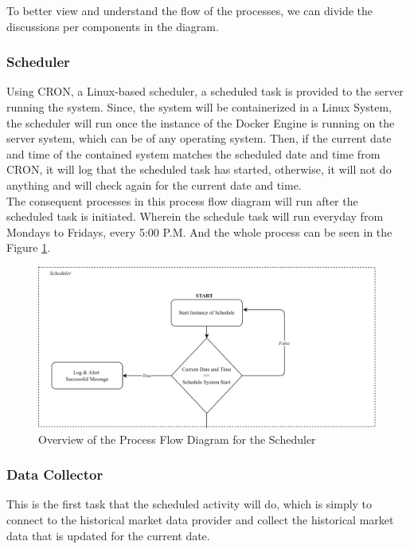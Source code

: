To better view and understand the flow of the processes, 
we can divide the discussions per components in the diagram.

\subsubsection{Scheduler}
\label{subsubsc:scheduler}
Using CRON, a Linux-based scheduler, a 
scheduled task is provided to the server running the system. Since, 
the system will be containerized in a Linux System, the scheduler will 
run once the instance of the Docker Engine is running on the server system, 
which can be of any operating system. Then, if the current date and time of 
the contained system matches the scheduled date and time from CRON, it will 
log that the scheduled task has started, otherwise, it will not do anything 
and will check again for the current date and time.
\hfill \\

The consequent processes in this process flow diagram will run after the 
scheduled task is initiated. Wherein the schedule task will run everyday from 
Mondays to Fridays, every 5:00 P.M. And the whole process can be seen in the 
Figure \ref{fig:process_flowchart_scheduler}.
\begin{figure}[ht]
    \centering
    \includegraphics[width=1\textwidth]{./assets/ProcessFlowchart_Scheduler.png}
    \caption{Overview of the Process Flow Diagram for the Scheduler}
    \label{fig:process_flowchart_scheduler}
\end{figure}
\FloatBarrier

\subsubsection{Data Collector}
\label{subsubsec:data_ollector}
This is the first task that the scheduled 
activity will do, which is simply to connect to the historical market 
data provider and collect the historical market data that is updated for 
the current date.
\hfill \\

